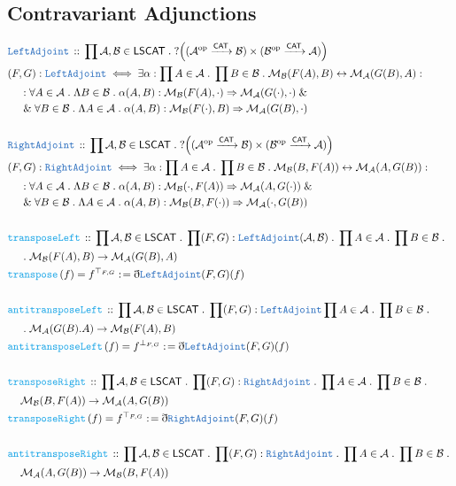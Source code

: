\documentclass[12pt]{scrartcl}
\newcommand{\TYPE}[1]{\textcolor{NavyBlue}{\mathtt{#1}}}
\newcommand{\FUNC}[1]{\textcolor{Cerulean}{\mathtt{#1}}}
\renewcommand{\.}{\; . \;}
\newcommand{\de}{: \kern 0.1pc =}
\newcommand{\Act}[1]{\left( #1 \right)}
\newcommand{\DeclareType}[2]{& \TYPE{#1} \, :: \, #2 \\}
\newcommand{\DefineType}[3]{& #1 : \TYPE{#2} \iff #3 \\}
\newcommand{\DeclareFunc}[2]{& \FUNC{#1} \, :: \, #2 \\}
\newcommand{\DefineNamedFunc}[4]{&  \FUNC{#1}\Act{#2} = #3 \de #4 \\}
\newcommand{\NewLine}{\\ & \kern 1pc}
\newcommand{\Page}[1]{ \begin{align*} #1 \end{align*}   }
\newcommand{ \bd }{ \ByDef }
\renewcommand{\And}{\; \& \;}
\newcommand{\Mor}{\mathcal{M}}
\newcommand{\ToBij}{\leftrightarrow}
\newcommand{\Arrow}{\xrightarrow}
\newcommand{\ByDef}{\eth}
\newcommand{\op}{\mathrm{op}}
\newcommand{\A}{\mathcal{A}}
\newcommand{\B}{\mathcal{B}}
\newcommand{\CAT}{\mathsf{CAT}}
\begin{document}
\subsection{Contravariant Adjunctions}
\Page{
	\DeclareType{LeftAdjoint}{\prod \A,\B \in \mathsf{LSCAT} \. 
		?\Big( (\A^\op \Arrow{\CAT} \B) \times (\B^\op \Arrow{\CAT} \A)  \Big)  }
	\DefineType{(F,G)}{LeftAdjoint}{ 
		\exists \alpha : 
			\prod A \in \A \. 
			\prod B \in \B \. 
			\Mor_\B(F(A),B) \ToBij \Mor_\A(G(B),A) :  \NewLine : 
		\forall A \in \A \. 
			 \Lambda B \in \B \. 
			 \alpha(A,B) : \Mor_\B(F(A),\cdot) \Rightarrow \Mor_\A(G(\cdot),\cdot) 
		\And \NewLine \And
		\forall B \in \B \.
			\Lambda A \in \A \.
			\alpha(A,B) : \Mor_\B(F(\cdot),B) \Rightarrow \Mor_\A(G(B),\cdot)
	}
	\\
	\DeclareType{RightAdjoint}{\prod \A,\B \in \mathsf{LSCAT} 
		\. ?\Big( (\A^\op \Arrow{\CAT} \B) \times (\B^\op \Arrow{\CAT} \A)  \Big)  }
	\DefineType{(F,G)}{RightAdjoint}{ 
		\exists \alpha : 
			\prod A \in \A \. 
			\prod B \in \B \. 
			\Mor_\B(B,F(A)) \ToBij \Mor_\A(A,G(B)) :  \NewLine : 
		\forall A \in \A \. 
			 \Lambda B \in \B \. 
			 \alpha(A,B) : \Mor_\B(\cdot,F(A)) \Rightarrow \Mor_\A(A,G(\cdot)) 
		\And \NewLine \And
		\forall B \in \B \.
			\Lambda A \in \A \.
			\alpha(A,B) : \Mor_\B(B, F(\cdot)) \Rightarrow \Mor_\A(\cdot,G(B))
	}
	\\
	\DeclareFunc{transposeLeft}{
		\prod \A,\B \in \mathsf{LSCAT} \.
		\prod (F,G) : \TYPE{LeftAdjoint}(\A,\B)   \. 
		\prod A \in \A \.
		\prod B \in \B \. \NewLine \.
		\Mor_{\B}(F(A),B) \to \Mor_{\A}(G(B),A)
	}
	\DefineNamedFunc{transpose}{f}{f^{\top_{F,G}}}{\bd \TYPE{LeftAdjoint}(F,G)(f)}
	\\
	\DeclareFunc{antitransposeLeft}{
		\prod \A,\B \in \mathsf{LSCAT} \.
		\prod   (F,G) : \TYPE{LeftAdjoint}
		\prod A \in \A \.
		\prod B \in \B \.  \NewLine \.                     
		\Mor_{\A}(G(B).A) \to \Mor_{\B}(F(A),B)
	}
	\DefineNamedFunc{antitransposeLeft}{f}{f^{\bot_{F,G}}}{\bd \TYPE{LeftAdjoint}(F,G)(f)}
	\\
	\DeclareFunc{transposeRight}{
		\prod \A,\B \in \mathsf{LSCAT} \.
		\prod  (F,G) : \TYPE{RightAdjoint} \.
		\prod A \in \A \.
		\prod B \in \B \. \NewLine
		\Mor_{\B}(B, F(A)) \to \Mor_{\A}(A,G(B))
	}
	\DefineNamedFunc{transposeRight}{f}{f^{\top_{F,G}}}{\bd \TYPE{RightAdjoint}(F,G)(f)}
	\\
	\DeclareFunc{antitransposeRight}{
		\prod \A,\B \in \mathsf{LSCAT} \.
		\prod   (F,G) : \TYPE{RightAdjoint}  \. 
		\prod A \in \A \.
		\prod B \in \B \. \NewLine
		\Mor_{\A}(A,G(B)) \to \Mor_{\B}(B,F(A))
}}
\end{document}
